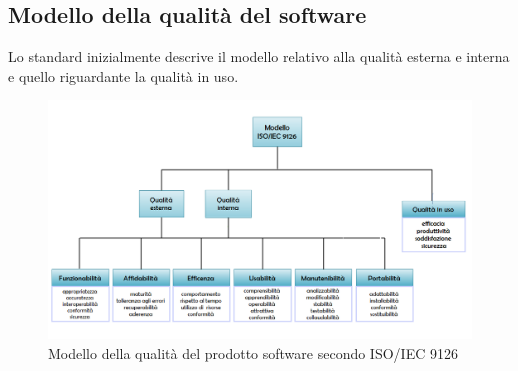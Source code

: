 \documentclass[a4paper, titlepage]{article}
\begin{document}
\subsection{Modello della qualità del software}
Lo standard inizialmente descrive il modello relativo alla qualità esterna e interna
e quello riguardante la qualità in uso.
\begin{figure}[htp]
\centering
\includegraphics[scale=0.49]{Img/iso9126.png}
\caption{Modello della qualità del prodotto software secondo ISO/IEC 9126}
\end{figure}
\end{document}

